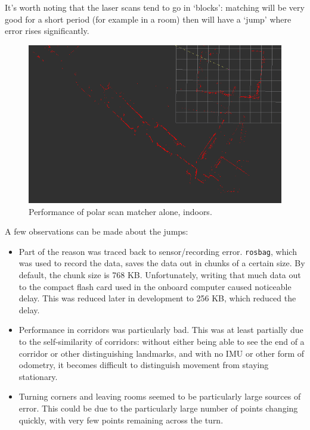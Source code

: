 \documentclass[12pt,oneside,a4paper]{book}
\begin{document}
It's worth noting that the laser scans tend to go in `blocks':
matching will be very good for a short period (for example in a room)
then will have a `jump' where error rises significantly.

\begin{figure}[h!]
  \centering
  \includegraphics[width=\textwidth]{figs/indoor}
  \caption{Performance of polar scan matcher alone, indoors.}
  \label{fig:psm-indoors}
\end{figure}

A few observations can be made about the jumps:
\begin{itemize}
\item Part of the reason was traced back to sensor/recording
  error. \texttt{rosbag}, which was used to record the data, saves the
  data out in chunks of a certain size. By default, the chunk size is
  768 KB. Unfortunately, writing that much data out to the compact
  flash card used in the onboard computer caused noticeable
  delay. This was reduced later in development to 256 KB, which
  reduced the delay.
\item Performance in corridors was particularly bad. This was at least
  partially due to the self-similarity of corridors: without either
  being able to see the end of a corridor or other distinguishing
  landmarks, and with no IMU or other form of odometry, it becomes
  difficult to distinguish movement from staying stationary.
\item Turning corners and leaving rooms seemed to be particularly
  large sources of error. This could be due to the particularly large
  number of points changing quickly, with very few points remaining
  across the turn.
\end{itemize}
\end{document}
